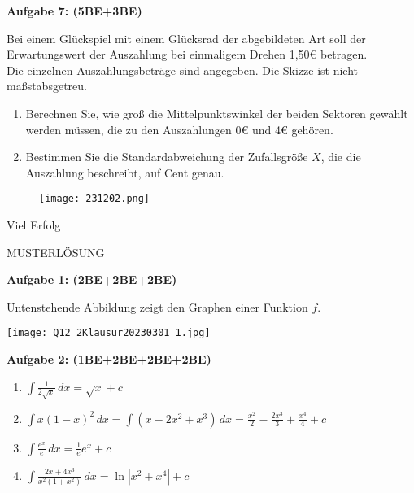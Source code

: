 \documentclass[a4paper,12pt]{article}
\newcommand{\Aufgabe}[1]{
  {
  \vspace*{0.5cm}
  \textsf{\textbf{Aufgabe #1}}
  \vspace*{0.2cm}
  
  }
}
\begin{document}
\Aufgabe{7: (5BE+3BE)}
\begin{minipage}[t]{0.7\textwidth}
  Bei einem Glückspiel mit einem Glücksrad der abgebildeten Art soll der Erwartungswert der Auszahlung bei einmaligem Drehen 1,50\euro{} betragen.\\
  Die einzelnen Auszahlungsbeträge sind angegeben. Die Skizze ist nicht maßstabsgetreu.
  \begin{enumerate}[label={\alph*)}]
    \item Berechnen Sie, wie groß die Mittelpunktswinkel der beiden Sektoren gewählt werden müssen, die zu den Auszahlungen 0\euro{} und 4\euro{} gehören.
    \item Bestimmen Sie die Standardabweichung der Zufallsgröße $X$, die die Auszahlung beschreibt, auf Cent genau.
  \end{enumerate}
\end{minipage}
\hspace*{0.75cm}
\begin{minipage}[t]{0.3\textwidth}
  \begin{figure}[H]
    \vspace{0cm}
    \centering
    \texttt{[image: 231202.png]}
  \end{figure}
\end{minipage}

\vspace{2cm}
\centerline{Viel Erfolg \faThumbsOUp }

\newpage
{
\Huge{MUSTERLÖSUNG}
}

\small

\Aufgabe{1: (2BE+2BE+2BE)}

Untenstehende Abbildung zeigt den Graphen einer Funktion $f$.
\begin{center}
\texttt{[image: Q12\_2Klausur20230301\_1.jpg]}
\end{center}

\vspace{5cm}

\Aufgabe{2: (1BE+2BE+2BE+2BE)}

\begin{enumerate}[label={\alph*)}]
  \item $\int \frac{1}{2\sqrt{x}}\, dx = \sqrt{x} +c$
  \item $\int x(1-x)^2\, dx = \int (x-2x^2+x^3)\, dx=\frac{x^2}{2}-\frac{2x^3}{3}+\frac{x^4}{4} +c $
  \item $\int \frac{e^x}{e}\, dx=\frac{1}{e} e^x +c$
  \item $\int \frac{2x+4x^3}{x^2(1+x^2)}\, dx=\ln |x^2+x^4|+c$
\end{enumerate}
\end{document}

